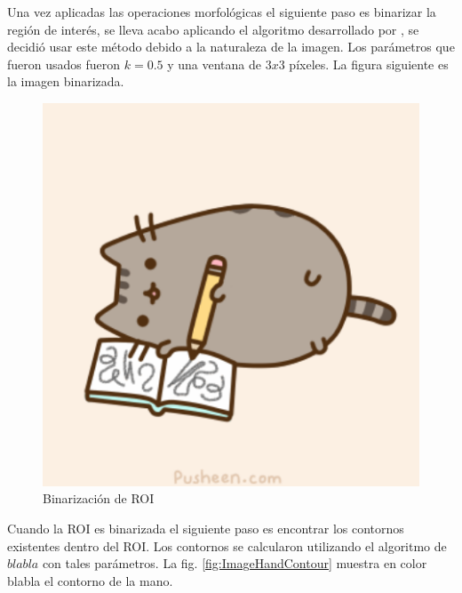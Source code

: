 Una vez aplicadas las operaciones morfológicas el siguiente paso es binarizar la región de interés, se lleva acabo aplicando el algoritmo desarrollado por \citep{Niblack1985}, se decidió usar este método debido a la naturaleza de la imagen. Los parámetros que fueron usados fueron $k=0.5$ y una ventana de $3x3$ p\'ixeles. La figura siguiente es la imagen binarizada. 

\begin{figure}[h!]
\begin{center}
\includegraphics[scale=.5]{./Figures/pusheen.png}
\end{center}
\caption{Binarización de ROI}
\label{fig:BinarizationRoi}
\end{figure}
 
Cuando la ROI es binarizada el siguiente paso es encontrar los contornos existentes dentro del ROI. Los contornos se calcularon utilizando el algoritmo de $blabla$ con tales parámetros. La fig. \ref{fig:ImageHandContour} muestra en color blabla el contorno de la mano. 

